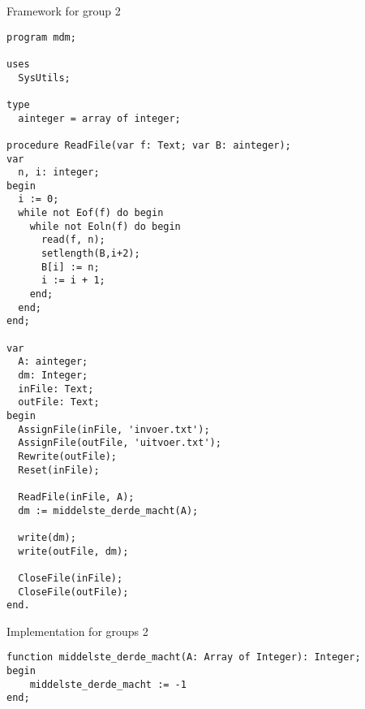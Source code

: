 \documentclass[a4paper,10pt]{report}
\begin{document}
\begin{algorithm}
\caption{Framework for group 2}
\label{fr:gr2}
\begin{lstlisting}
program mdm;

uses
  SysUtils;

type
  ainteger = array of integer;

procedure ReadFile(var f: Text; var B: ainteger);
var
  n, i: integer;
begin
  i := 0;
  while not Eof(f) do begin
    while not Eoln(f) do begin
      read(f, n);
      setlength(B,i+2);
      B[i] := n;
      i := i + 1;
    end;
  end;
end;

var
  A: ainteger;
  dm: Integer;
  inFile: Text;
  outFile: Text;
begin
  AssignFile(inFile, 'invoer.txt');
  AssignFile(outFile, 'uitvoer.txt');
  Rewrite(outFile);
  Reset(inFile);

  ReadFile(inFile, A);
  dm := middelste_derde_macht(A);

  write(dm);
  write(outFile, dm);

  CloseFile(inFile);
  CloseFile(outFile);
end.
\end{lstlisting}
\end{algorithm}

\begin{algorithm}
\caption{Implementation for groups 2}
\label{imp:gr2}
\begin{lstlisting}
function middelste_derde_macht(A: Array of Integer): Integer;
begin
    middelste_derde_macht := -1
end;
\end{lstlisting}
\end{algorithm}
\end{document}
